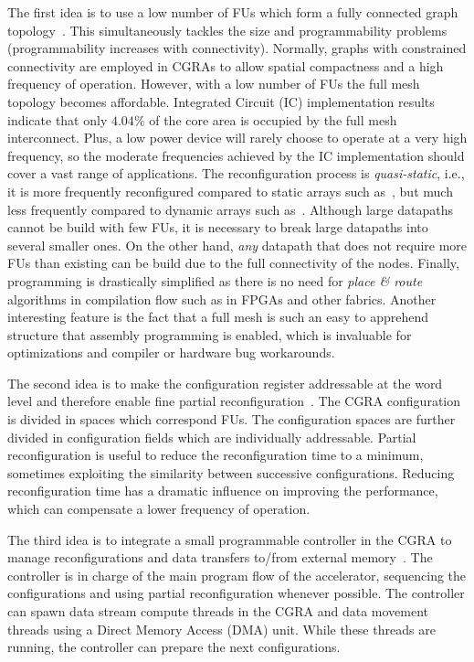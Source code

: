 The first idea is to use a low number of FUs which form a fully
connected graph topology~\cite{vecparBook16}. This simultaneously
tackles the size and programmability problems (programmability
increases with connectivity). Normally, graphs with constrained
connectivity are employed in CGRAs to allow spatial compactness and a
high frequency of operation. However, with a low number of FUs the
full mesh topology becomes affordable. Integrated Circuit (IC)
implementation results indicate that only $4.04\%$ of the core area is
occupied by the full mesh interconnect. Plus, a low power device will
rarely choose to operate at a very high frequency, so the moderate
frequencies achieved by the IC implementation should cover a vast
range of applications.  The reconfiguration process is {\em
  quasi-static}, i.e., it is more frequently reconfigured compared to
static arrays such as~\cite{Hartenstein99}, but much less frequently
compared to dynamic arrays such as~\cite{Mei05}. Although large
datapaths cannot be build with few FUs, it is necessary to break large
datapaths into several smaller ones. On the other hand, {\em any}
datapath that does not require more FUs than existing can be build due
to the full connectivity of the nodes. Finally, programming is
drastically simplified as there is no need for {\em place \& route}
algorithms in compilation flow such as in FPGAs and other
fabrics. Another interesting feature is the fact that a full mesh is
such an easy to apprehend structure that assembly programming is
enabled, which is invaluable for optimizations and compiler or
hardware bug workarounds.

The second idea is to make the configuration register addressable at
the word level and therefore enable fine partial
reconfiguration~\cite{vecparBook16}. The CGRA configuration is divided
in spaces which correspond FUs. The configuration spaces are further
divided in configuration fields which are individually
addressable. Partial reconfiguration is useful to reduce the
reconfiguration time to a minimum, sometimes exploiting the similarity
between successive configurations. Reducing reconfiguration time has a
dramatic influence on improving the performance, which can compensate
a lower frequency of operation.

The third idea is to integrate a small programmable controller in the
CGRA to manage reconfigurations and data transfers to/from external
memory~\cite{jcer16}. The controller is in charge of the main program
flow of the accelerator, sequencing the configurations and using
partial reconfiguration whenever possible. The controller can spawn
data stream compute threads in the CGRA and data movement threads
using a Direct Memory Access (DMA) unit. While these threads are
running, the controller can prepare the next configurations.


